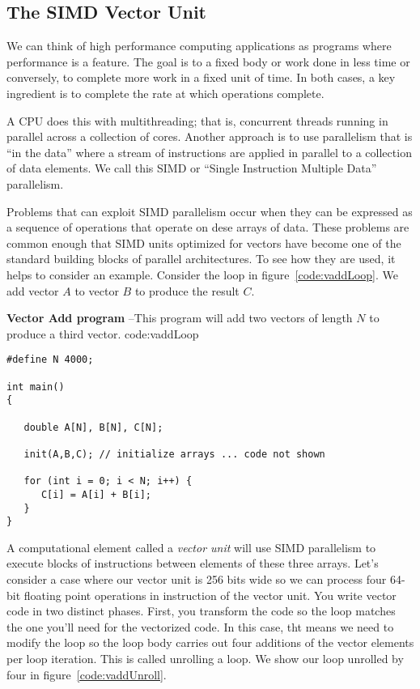 \subsection{The SIMD Vector Unit}

We can think of high performance computing applications as programs where performance is a feature.
The goal is to a fixed body or work done in less time or conversely, to complete more work in a fixed unit of time.
In both cases, a key ingredient is to complete the rate at which operations complete.   

A CPU does this with multithreading; that is, concurrent threads running in parallel across a collection of cores. 
Another approach is to use parallelism that is ``in the data'' where a stream of instructions are applied in
parallel to a collection of data elements.  We call this 
SIMD or ``Single Instruction Multiple Data'' parallelism.

Problems that can exploit SIMD parallelism occur when they can be expressed as a sequence of
operations that operate on dese arrays of data.   These problems are common enough that SIMD units optimized
for vectors have become one of the standard building blocks of parallel architectures.  To see
how they are used, it helps to consider an example.  Consider the loop in figure~\ref{code:vaddLoop}.  
We add vector $A$ to vector $B$ to produce the result $C$.   


\begin{CodeExample}%
{\textbf{Vector Add program} --\small This program will add two vectors of length $N$
to produce a third vector.
}%
{code:vaddLoop}
\begin{lstlisting}
#define N 4000;

int main()
{

   double A[N], B[N], C[N];
     
   init(A,B,C); // initialize arrays ... code not shown
   
   for (int i = 0; i < N; i++) {
      C[i] = A[i] + B[i];
   }
}	  
\end{lstlisting}
\end{CodeExample}


A computational element called a \emph{vector unit}
will use SIMD parallelism to execute blocks of instructions between elements of these three arrays.  
Let's consider a case where our vector unit is 256 bits
wide so we can process four 64-bit floating point operations in instruction of the vector unit.  You write
vector code in two distinct phases. First, you transform the code so the loop matches the one you'll
need for the vectorized code.   In this case, tht means we need to 
modify the loop so the loop body carries out four additions of the vector elements per loop iteration.
This is called unrolling a loop.  We show our loop unrolled by four in figure~\ref{code:vaddUnroll}.  


